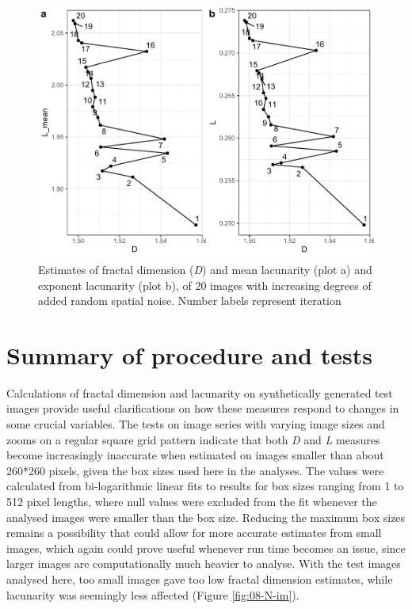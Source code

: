 \documentclass[
  12pt,
  a4paper, twoside]{book}
\begin{document}
\begin{figure}

{\centering \includegraphics[width=0.9\linewidth]{bookdown-demo_files/figure-latex/08-noise-1} 

}

\caption[D and L estimates with variable degrees of added random noise]{Estimates of fractal dimension (\emph{D}) and mean lacunarity (plot a) and exponent lacunarity (plot b), of 20 images with increasing degrees of added random spatial noise. Number labels represent iteration}\label{fig:08-noise}
\end{figure}

\FloatBarrier

\hypertarget{summary-of-procedure-and-tests}{%
\section{Summary of procedure and tests}\label{summary-of-procedure-and-tests}}

Calculations of fractal dimension and lacunarity on synthetically generated test images provide useful clarifications on how these measures respond to changes in some crucial variables. The tests on image series with varying image sizes and zooms on a regular square grid pattern indicate that both \emph{D} and \emph{L} measures become increasingly inaccurate when estimated on images smaller than about 260*260 pixels, given the box sizes used here in the analyses. The values were calculated from bi-logarithmic linear fits to results for box sizes ranging from 1 to 512 pixel lengths, where null values were excluded from the fit whenever the analysed images were smaller than the box size. Reducing the maximum box sizes remains a possibility that could allow for more accurate estimates from small images, which again could prove useful whenever run time becomes an issue, since larger images are computationally much heavier to analyse. With the test images analysed here, too small images gave too low fractal dimension estimates, while lacunarity was seemingly less affected (Figure \ref{fig:08-N-im}).
\end{document}
